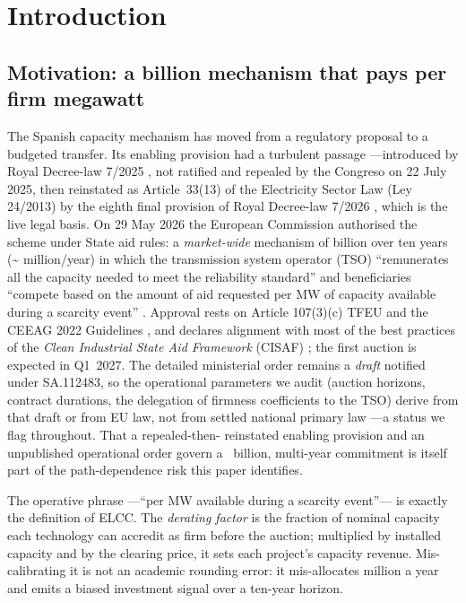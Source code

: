 \documentclass[11pt,a4paper]{article}
\begin{document}
\section{Introduction}

\subsection{Motivation: a  billion mechanism that pays per firm megawatt}

The Spanish capacity mechanism has moved from a regulatory proposal to a budgeted
transfer. Its enabling provision had a turbulent passage ---introduced by Royal
Decree-law 7/2025 \citep{rdl72025}, not ratified and repealed by the Congreso on 22
July 2025, then reinstated as Article~33(13) of the Electricity Sector Law (Ley
24/2013) by the eighth final provision of Royal Decree-law 7/2026 \citep{rdl72026},
which is the live legal basis. On 29 May 2026 the European Commission authorised the
scheme under State aid rules: a \emph{market-wide} mechanism of  billion over
ten years (\textasciitilde{} million/year) in which the transmission system
operator (TSO) ``remunerates all the capacity needed to meet the reliability
standard'' and beneficiaries ``compete based on the amount of aid requested per MW of
capacity available during a scarcity event'' \citep{ec2026sa112483}. Approval rests on
Article 107(3)(c) TFEU and the CEEAG 2022 Guidelines \citep{ceeag2022}, and declares
alignment with most of the best practices of the \emph{Clean Industrial State Aid
Framework} (CISAF) \citep{cisaf2025}; the first auction is expected in Q1~2027. The
detailed ministerial order remains a \emph{draft} notified under SA.112483, so the
operational parameters we audit (auction horizons, contract durations, the delegation
of firmness coefficients to the TSO) derive from that draft or from EU law, not from
settled national primary law ---a status we flag throughout. That a repealed-then-
reinstated enabling provision and an unpublished operational order govern a
~billion, multi-year commitment is itself part of the path-dependence risk this
paper identifies.

The operative phrase ---``per MW available during a scarcity event''--- is exactly
the definition of ELCC. The \emph{derating factor} is the fraction of nominal
capacity each technology can accredit as firm before the auction; multiplied by
installed capacity and by the clearing price, it sets each project's capacity
revenue. Mis-calibrating it is not an academic rounding error: it mis-allocates
 million a year and emits a biased investment signal over a ten-year
horizon.
\end{document}
